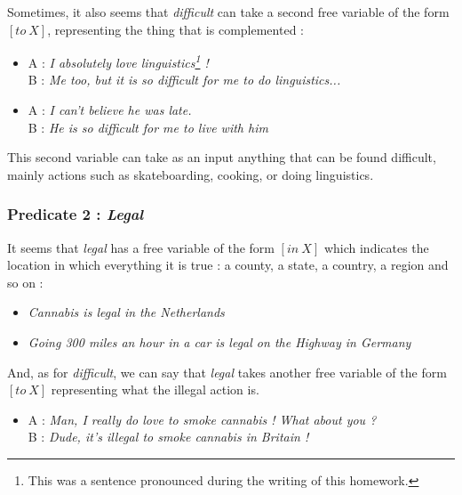 \documentclass{cours}
\begin{document}
                    Sometimes, it also seems that \textsl{difficult} can take a second free variable of the form ${\left[to\ X\right]}$, representing the thing that is complemented :
                    \begin{itemize}
                        \item A : \textsl{I absolutely love linguistics\footnote{This was a sentence pronounced during the writing of this homework.} !}\\
                        B : \textsl{Me too, but it is so difficult \textit{for me} \textit{to do linguistics}...}
                        \item A : \textsl{I can't believe he was late.}\\
                        B : \textsl{He is so difficult \textit{for me} \textit{to live with him}}
                    \end{itemize}
                    This second variable can take as an input anything that can be found difficult, mainly actions such as skateboarding, cooking, or doing linguistics.
    
                \subsubsection{Predicate 2 : \textsl{Legal}}
                    It seems that \textsl{legal} has a free variable of the form ${\left[in\ X\right]}$ which indicates the location in which everything it is true : a county, a state, a country, a region and so on : 
                    \begin{itemize}
                        \item \textsl{Cannabis is legal \textit{in the Netherlands}}
                        \item \textsl{Going 300 miles an hour in a car is legal \textit{on the Highway in Germany}}
                    \end{itemize}
    
                    And, as for \textsl{difficult}, we can say that \textsl{legal} takes another free variable of the form $\left[to \  X\right]$ representing what the illegal action is. 
                    \begin{itemize}
                        \item A : \textsl{Man, I really do love to smoke cannabis ! What about you ?}\\
                        B : \textsl{Dude, it's illegal \textit{to smoke cannabis} \textit{in Britain} !}
                    \end{itemize}
    
\end{document}
